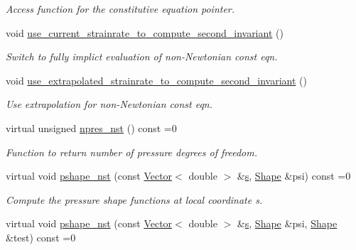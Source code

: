 \begin{DoxyCompactItemize}
\begin{DoxyCompactList}\small\item\em Access function for the constitutive equation pointer. \end{DoxyCompactList}\item 
void \hyperlink{classoomph_1_1GeneralisedNewtonianNavierStokesEquations_a802df1486155e87fcc92f1db750cec3c}{use\+\_\+current\+\_\+strainrate\+\_\+to\+\_\+compute\+\_\+second\+\_\+invariant} ()
\begin{DoxyCompactList}\small\item\em Switch to fully implict evaluation of non-\/\+Newtonian const eqn. \end{DoxyCompactList}\item 
void \hyperlink{classoomph_1_1GeneralisedNewtonianNavierStokesEquations_a85fb3698432bdb708790a3f78d4ee5eb}{use\+\_\+extrapolated\+\_\+strainrate\+\_\+to\+\_\+compute\+\_\+second\+\_\+invariant} ()
\begin{DoxyCompactList}\small\item\em Use extrapolation for non-\/\+Newtonian const eqn. \end{DoxyCompactList}\item 
virtual unsigned \hyperlink{classoomph_1_1GeneralisedNewtonianNavierStokesEquations_ad25a5d1b7a7e7cf128b9154f08739824}{npres\+\_\+nst} () const =0
\begin{DoxyCompactList}\small\item\em Function to return number of pressure degrees of freedom. \end{DoxyCompactList}\item 
virtual void \hyperlink{classoomph_1_1GeneralisedNewtonianNavierStokesEquations_a84735d21f3d1ade819726a71a7b462e1}{pshape\+\_\+nst} (const \hyperlink{classoomph_1_1Vector}{Vector}$<$ double $>$ \&\hyperlink{cfortran_8h_ab7123126e4885ef647dd9c6e3807a21c}{s}, \hyperlink{classoomph_1_1Shape}{Shape} \&psi) const =0
\begin{DoxyCompactList}\small\item\em Compute the pressure shape functions at local coordinate s. \end{DoxyCompactList}\item 
virtual void \hyperlink{classoomph_1_1GeneralisedNewtonianNavierStokesEquations_afb01a54f377b1bebe141ed8e11ced138}{pshape\+\_\+nst} (const \hyperlink{classoomph_1_1Vector}{Vector}$<$ double $>$ \&\hyperlink{cfortran_8h_ab7123126e4885ef647dd9c6e3807a21c}{s}, \hyperlink{classoomph_1_1Shape}{Shape} \&psi, \hyperlink{classoomph_1_1Shape}{Shape} \&test) const =0

\end{DoxyCompactItemize}
